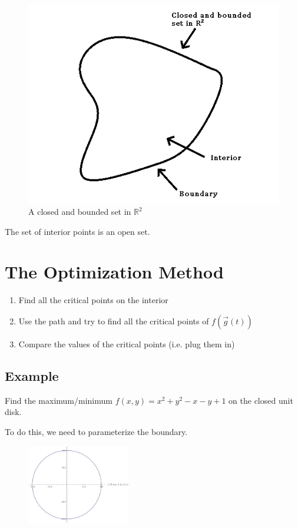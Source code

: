 \documentclass{article}
\begin{document}
\begin{figure}[h!]
    \centering
    \includegraphics[scale=.5]{closedAndBounded.png}
    \caption{A closed and bounded set in $\mathbb{R}^2$}
    \label{}
\end{figure}
The set of interior points is an open set.

\section{The Optimization Method}

\begin{enumerate}
    \item Find all the critical points on the interior
    \item Use the path and try to find all the critical points of $f(\vec{g}(t))$
    \item Compare the values of the critical points (i.e. plug them in)
\end{enumerate}

\subsection*{Example}
Find the maximum/minimum $f(x,y)=x^2+y^2-x-y+1$ on the closed unit disk.

To do this, we need to parameterize the boundary.

\begin{figure}
    \begin{center}
      \includegraphics[width=0.40\textwidth]{wolframUnitCircle.jpg}
    \end{center}
\end{figure}
\end{document}
